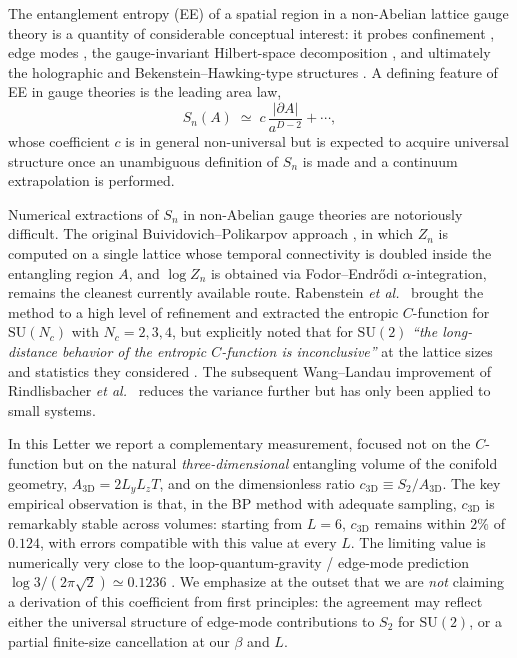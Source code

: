 \documentclass[aps,prl,reprint,superscriptaddress,floatfix,nofootinbib,amssymb]{revtex4-2}
\newcommand{\SUtwo}{\mathrm{SU}(2)}
\newcommand{\SUN}{\mathrm{SU}(N_c)}
\begin{document}
The entanglement entropy (EE) of a spatial region in a non-Abelian lattice gauge theory is a quantity of considerable conceptual interest: it probes confinement \cite{KKM2007}, edge modes \cite{Donnelly2012,DonnellyWall2014}, the gauge-invariant Hilbert-space decomposition \cite{Aoki2015}, and ultimately the holographic and Bekenstein--Hawking-type structures \cite{ABCK1998}. A defining feature of EE in gauge theories is the leading area law,
\begin{equation}
S_n(A) \;\simeq\; c\,\frac{|\partial A|}{a^{D-2}} + \cdots,
\label{eq:arealaw}
\end{equation}
whose coefficient $c$ is in general non-universal but is expected to acquire universal structure once an unambiguous definition of $S_n$ is made and a continuum extrapolation is performed.

Numerical extractions of $S_n$ in non-Abelian gauge theories are notoriously difficult. The original Buividovich--Polikarpov approach \cite{BP2008b}, in which $Z_n$ is computed on a single lattice whose temporal connectivity is doubled inside the entangling region $A$, and $\log Z_n$ is obtained via Fodor--Endr\H{o}di $\alpha$-integration, remains the cleanest currently available route. Rabenstein \emph{et al.}\ \cite{Rabenstein2019} brought the method to a high level of refinement and extracted the entropic $C$-function for $\SUN$ with $N_c=2,3,4$, but explicitly noted that for $\SUtwo$ \emph{``the long-distance behavior of the entropic $C$-function is inconclusive''} at the lattice sizes and statistics they considered \cite{Rabenstein2019}. The subsequent Wang--Landau improvement of Rindlisbacher \emph{et al.}\ \cite{Rindlisbacher2022} reduces the variance further but has only been applied to small systems.

In this Letter we report a complementary measurement, focused not on the $C$-function but on the natural \emph{three-dimensional} entangling volume of the conifold geometry, $A_{3\text{D}} = 2 L_y L_z T$, and on the dimensionless ratio $c_{3\text{D}}\equiv S_2/A_{3\text{D}}$. The key empirical observation is that, in the BP method with adequate sampling, $c_{3\text{D}}$ is remarkably stable across volumes: starting from $L\!=\!6$, $c_{3\text{D}}$ remains within $2\%$ of $0.124$, with errors compatible with this value at every $L$. The limiting value is numerically very close to the loop-quantum-gravity / edge-mode prediction $\log 3/(2\pi\sqrt 2)\simeq 0.1236$ \cite{ABCK1998,Donnelly2012,DonnellyWall2014}. We emphasize at the outset that we are \emph{not} claiming a derivation of this coefficient from first principles: the agreement may reflect either the universal structure of edge-mode contributions to $S_2$ for $\SUtwo$, or a partial finite-size cancellation at our $\beta$ and $L$.
\end{document}
